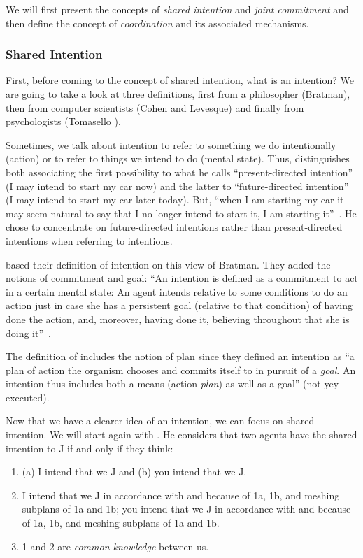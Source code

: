 \documentclass[a4paper,11pt,twoside]{StyleThese}
\begin{document}
We will first present the concepts of \emph{shared intention} and \emph{joint commitment} and then define the concept of \emph{coordination} and its associated mechanisms. 

\subsubsection{Shared Intention}
First, before coming to the concept of shared intention, what is an intention? We are going to take a look at three definitions, first from a philosopher (Bratman), then from computer scientists (Cohen and Levesque) and finally from psychologists (Tomasello \etal). 

Sometimes, we talk about intention to refer to something we do intentionally (action) or to refer to things we intend to do (mental state). Thus, \cite{bratman_1984_two} distinguishes both associating the first possibility to what he calls ``present-directed intention'' (I may intend to start my car now) and the latter to ``future-directed intention'' (I may intend to start my car later today). But, ``when I am starting my car it may seem natural to say that I no longer intend to start it, I am starting it''~\citep[p.~379]{bratman_1984_two}. He chose to concentrate on future-directed intentions rather than present-directed intentions when referring to intentions. 

\cite{cohen_1990_intention} based their definition of intention on this view of Bratman. They added the notions of commitment and goal: ``An intention is defined as a commitment to act in a certain mental state: An agent intends relative to some conditions to do an action just in case she has a persistent goal (relative to that condition) of having done the action, and, moreover, having done it, believing throughout that she is doing it''~\citep[p.~496]{cohen_1991_teamwork}. 

The definition of \citet[p.~676]{tomasello_2005_understanding} includes the notion of plan since they defined an intention as ``a plan of action the organism chooses and commits itself to in pursuit of a \emph{goal}. An intention thus includes both a means (action \emph{plan}) as well as a goal'' (not yey executed). 

Now that we have a clearer idea of an intention, we can focus on shared intention. We will start again with \cite{bratman_1993_shared}. He considers that two agents have the shared intention to J if and only if they think: 
\begin{enumerate}
	\item (a) I intend that we J and (b) you intend that we J.
	\item\relax I intend that we J in accordance with and because of 1a, 1b, and meshing subplans of 1a and 1b; you intend that we J in accordance with and because of 1a, 1b, and meshing subplans of 1a and 1b.
	\item 1 and 2 are \emph{common knowledge} between us.
\end{enumerate}
\end{document}
